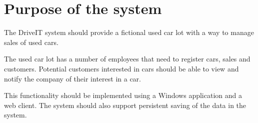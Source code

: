 \section{Purpose of the system}
The DriveIT system should provide a fictional used car lot with a way to manage sales of used cars. 

The used car lot has a number of employees that need to register cars, sales and customers. Potential customers interested in cars should be able to view and notify the company of their interest in a car. 

This functionality should be implemented using a Windows application and a web client. The system should also support persistent saving of the data in the system.